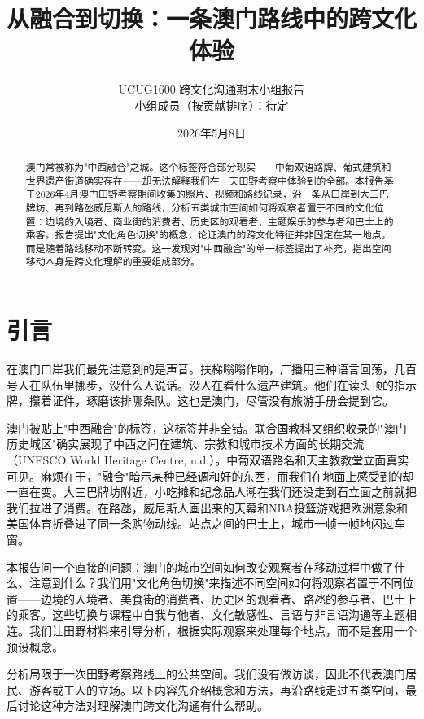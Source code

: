 \documentclass[12pt,a4paper]{article}
\title{从融合到切换：一条澳门路线中的跨文化体验}
\author{UCUG1600 跨文化沟通期末小组报告\\
小组成员（按贡献排序）：待定}
\date{2026年5月8日}
\begin{document}
\renewcommand{\abstractname}{摘要}
\maketitle

\begin{abstract}
澳门常被称为"中西融合"之城。这个标签符合部分现实——中葡双语路牌、葡式建筑和世界遗产街道确实存在——却无法解释我们在一天田野考察中体验到的全部。本报告基于2026年4月澳门田野考察期间收集的照片、视频和路线记录，沿一条从口岸到大三巴牌坊、再到路氹威尼斯人的路线，分析五类城市空间如何将观察者置于不同的文化位置：边境的入境者、商业街的消费者、历史区的观看者、主题娱乐的参与者和巴士上的乘客。报告提出"文化角色切换"的概念，论证澳门的跨文化特征并非固定在某一地点，而是随着路线移动不断转变。这一发现对"中西融合"的单一标签提出了补充，指出空间移动本身是跨文化理解的重要组成部分。
\end{abstract}

\section{引言}

在澳门口岸我们最先注意到的是声音。扶梯嗡嗡作响，广播用三种语言回荡，几百号人在队伍里挪步，没什么人说话。没人在看什么遗产建筑。他们在读头顶的指示牌，攥着证件，琢磨该排哪条队。这也是澳门，尽管没有旅游手册会提到它。

澳门被贴上"中西融合"的标签，这标签并非全错。联合国教科文组织收录的"澳门历史城区"确实展现了中西之间在建筑、宗教和城市技术方面的长期交流（UNESCO World Heritage Centre, n.d.）。中葡双语路名和天主教教堂立面真实可见。麻烦在于，"融合"暗示某种已经调和好的东西，而我们在地面上感受到的却一直在变。大三巴牌坊附近，小吃摊和纪念品人潮在我们还没走到石立面之前就把我们拉进了消费。在路氹，威尼斯人画出来的天幕和NBA投篮游戏把欧洲意象和美国体育折叠进了同一条购物动线。站点之间的巴士上，城市一帧一帧地闪过车窗。

本报告问一个直接的问题：澳门的城市空间如何改变观察者在移动过程中做了什么、注意到什么？我们用"文化角色切换"来描述不同空间如何将观察者置于不同位置——边境的入境者、美食街的消费者、历史区的观看者、路氹的参与者、巴士上的乘客。这些切换与课程中自我与他者、文化敏感性、言语与非言语沟通等主题相连。我们让田野材料来引导分析，根据实际观察来处理每个地点，而不是套用一个预设概念。

分析局限于一次田野考察路线上的公共空间。我们没有做访谈，因此不代表澳门居民、游客或工人的立场。以下内容先介绍概念和方法，再沿路线走过五类空间，最后讨论这种方法对理解澳门跨文化沟通有什么帮助。
\end{document}
